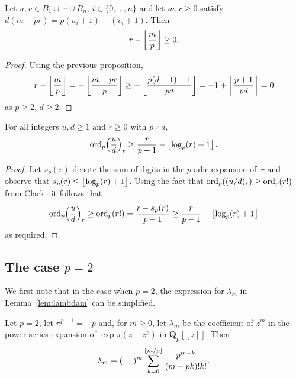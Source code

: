\begin{prop} \label{prop:mpr2}
Let $u, v \in B_1 \cup \dotsb \cup B_n$, $i \in \{0,\dotsc,n\}$ and 
let $m, r \geq 0$ satisfy $d(m-pr) = p(u_i + 1) - (v_i + 1)$.  Then 
\begin{equation*}
r - \left\lfloor\frac{m}{p}\right\rfloor \geq 0.
\end{equation*}
\end{prop}

\begin{proof}
Using the previous proposition,
\begin{equation*}
r - \left\lfloor\frac{m}{p}\right\rfloor 
= - \left\lfloor\frac{m-pr}{p}\right\rfloor 
\geq - \left\lfloor\frac{p(d-1)-1}{pd}\right\rfloor 
= -1 + \left\lceil\frac{p + 1}{pd}\right\rceil 
= 0 
\end{equation*}
as $p \geq 2$, $d \geq 2$.
\end{proof}

\begin{prop} \label{prop:rfac}
For all integers $u, d \geq 1$ and $r \geq 0$ with $p \nmid d$, 
\begin{equation*}
\operatorname{ord}_p\Bigl(\frac{u}{d}\Bigr)_r \geq \frac{r}{p-1} - \left\lfloor\log_p(r) + 1\right\rfloor.
\end{equation*}
\end{prop}

\begin{proof}
Let $s_p(r)$ denote the sum of digits in the $p$-adic expansion of~$r$ 
and observe that $s_p(r) \leq \left\lfloor\log_p(r) + 1\right\rfloor$.  Using the fact that 
$\operatorname{ord}_p((u/d)_r) \geq \operatorname{ord}_p(r!)$ from Clark~\citep[Page~265, Case~3]{Clark66} 
it follows that 
\begin{equation*}
\operatorname{ord}_p\Bigl(\frac{u}{d}\Bigr)_r \geq \operatorname{ord}_p(r!) = \frac{r - s_p(r)}{p-1} \geq \frac{r}{p-1} - \left\lfloor\log_p(r) + 1\right\rfloor
\end{equation*}
as required.
\end{proof}


\subsection{The case $p = 2$}

We first note that in the case when $p = 2$, the expression for 
$\lambda_m$ in Lemma~\ref{lem:lambdam} can be simplified.

\begin{cor} \label{cor:lambda2}
Let $p = 2$, let $\pi^{p-1} = -p$ and, for $m \geq 0$, let $\lambda_m$ 
be the coefficient of $z^m$ in the power series expansion of 
$\exp \pi (z - z^p)$ in $\mathbf{Q}_p[[z]]$.  Then 
\begin{equation*}
\lambda_m = (-1)^m \sum_{k=0}^{\left\lfloor m/p\right\rfloor} \frac{p^{m - k}}{(m - pk)! k!}.
\end{equation*}
\end{cor}

